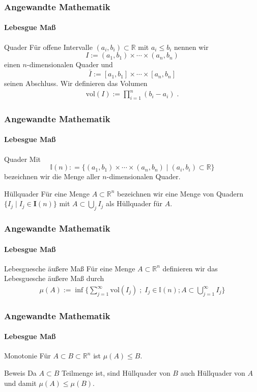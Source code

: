 \documentclass{beamer}
\begin{document}
\begin{frame}
    \frametitle{Angewandte Mathematik}
\framesubtitle{Lebesgue Maß}
    \begin{block}{Quader}
Für offene Intervalle $(a_i,b_i) \subset \mathbb{R}$ mit $a_i \leq b_i$ nennen wir 
$$I := (a_1,b_1) \times \cdots \times (a_n,b_n)$$ 
einen $n$-dimensionalen Quader und 
$$\bar{I}:= [a_1, b_1] \times \cdots \times [a_n,b_n]$$
 seinen Abschluss. Wir definieren das Volumen 
\begin{align*}
\text{vol} (I):=   \prod_{i = 1}^n (b_i -a_i)  \; .
\end{align*}

\end{block}
 \end{frame}



\begin{frame}
    \frametitle{Angewandte Mathematik}
\framesubtitle{Lebesgue Maß}
    \begin{block}{Quader}
Mit $$\mathbb{I}(n): = \{   (a_1,b_1) \times \cdots \times (a_n,b_n) \; | \;  (a_i, b_i) \subset \mathbb{R} \}$$ bezeichnen wir die Menge aller $n$-dimensionalen Quader. 
\end{block}
    \begin{block}{Hüllquader}
Für eine Menge $A \subset \mathbb{R}^n$ bezeichnen wir eine Menge von Quadern $\{ I_j \; | \;  I_j \in \mathbf{I}(n)  \}$ mit $A \subset \bigcup_j I_j$ als Hüllquader für $A$.
\end{block}
 \end{frame}


\begin{frame}
    \frametitle{Angewandte Mathematik}
\framesubtitle{Lebesgue Maß}
    \begin{block}{ Lebesguesche äußere Maß}
Für eine Menge $A \subset \mathbb{R}^n$ definieren wir das Lebesguesche äußere Maß durch 
\begin{align*}
\mu (A):=   \inf \biggl \{ \sum_{j=1}^{\infty}   \text{vol} (I_j)\; ; \; I_j \in \mathbb{I}(n); A \subset \bigcup_{j= 1}^{\infty} I_j \biggr \} 
\end{align*}
\end{block}
 \end{frame}



\begin{frame}
    \frametitle{Angewandte Mathematik}
\framesubtitle{Lebesgue Maß}
    \begin{block}{Monotonie}
Für $A \subset B \subset \mathbb{R}^n$ ist $\mu(A) \leq B$.
\end{block}

    \begin{block}{Beweis}
Da $A \subset B$ Teilmenge ist, sind Hüllquader von $B$  auch Hüllquader von $A$ und damit  $\mu(A) \leq \mu(B)$.
\end{block}
 \end{frame}
\end{document}

